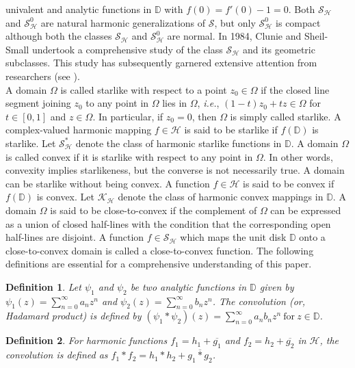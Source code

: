 \documentclass[11pt,reqno]{amsart}
\newtheorem{defi}{Definition}
\newtheorem{open problem}{Open problem}[section]
\newcommand{\ol}{\overline}
\numberwithin{equation}{section}
\begin{document}
univalent and analytic functions in $\mathbb{D}$ with $f(0)=f'(0)-1=0$. 
Both $\mathcal{S}_{\mathcal{H}}$ and $\mathcal{S}_{\mathcal{H}}^0$ are natural harmonic 
generalizations of $\mathcal{S}$, but only $\mathcal{S}_{\mathcal{H}}^0$ is compact although both the classes $\mathcal{S}_{\mathcal{H}}$ and $\mathcal{S}_{\mathcal{H}}^0$ are normal. In 1984, Clunie and Sheil-Small \cite{CS1984} undertook a comprehensive study of the class $\mathcal{S}_{\mathcal{H}}$ and its geometric subclasses. This study 
has subsequently garnered extensive attention from researchers (see \cite{BJJ2013, KPV2014,WL2001,MBG2024,BM2025, ABM2025,BM2026}). \\[2mm]
\indent A domain $\Omega$ is called starlike with respect to a point $z_0\in\Omega$ if the closed line segment joining $z_0$ to any point in $\Omega$ lies in $\Omega$, {\it i.e.}, 
$(1-t)z_0+t z\in\Omega$ for $t\in[0,1]$ and $z\in\Omega$. In particular, if $z_0=0$, then $\Omega$ is simply called starlike. A complex-valued harmonic mapping 
$f\in\mathcal{H}$ is said to be starlike if $f(\mathbb{D})$ is starlike. 
Let $\mathcal{S}_{\mathcal{H}}^*$ denote the class of harmonic starlike functions in $\mathbb{D}$. A domain $\Omega$ is called convex if it is starlike with respect to any point 
in $\Omega$. In other words, convexity implies starlikeness, but the converse is not necessarily true. A domain can be starlike 
without being convex. A function $f\in\mathcal{H}$ is said to be convex if $f(\mathbb{D})$ is convex. Let  $\mathcal{K}_{\mathcal{H}}$ denote the class of harmonic convex 
mappings in $\mathbb{D}$.  A domain $\Omega$ is said to be close-to-convex if the complement of $\Omega$ can be expressed as a union of closed half-lines with the condition that the corresponding open half-lines are disjoint. A function $f\in\mathcal{S}_{\mathcal{H}}$ which maps the unit disk $\mathbb{D}$ onto a close-to-convex domain is called a close-to-convex function.  The following definitions are essential for a comprehensive understanding of this paper.
\begin{defi}\cite{D1983,SS1989} Let $\psi_1$ and $\psi_2$ be two analytic functions in $\mathbb{D}$ given by $\psi_1(z)=\sum_{n=0}^{\infty}a_nz^n$ and $\psi_2(z)=\sum_{n=0}^{\infty}b_nz^n$. The convolution (or, Hadamard product) is defined by $\left(\psi_1*\psi_2\right)(z)=\sum_{n=0}^{\infty}a_nb_nz^n~\text{for}~ z\in\mathbb{D}$. \end{defi}
\begin{defi}\cite{G2002} For harmonic functions $f_1=h_1+\ol{g_1}$ and $f_2=h_2+\ol{g_2}$ in $\mathcal{H}$, the convolution is defined as $f_1*f_2=h_1*h_2+\ol{g_1*g_2}$.\end{defi}
\end{document}
